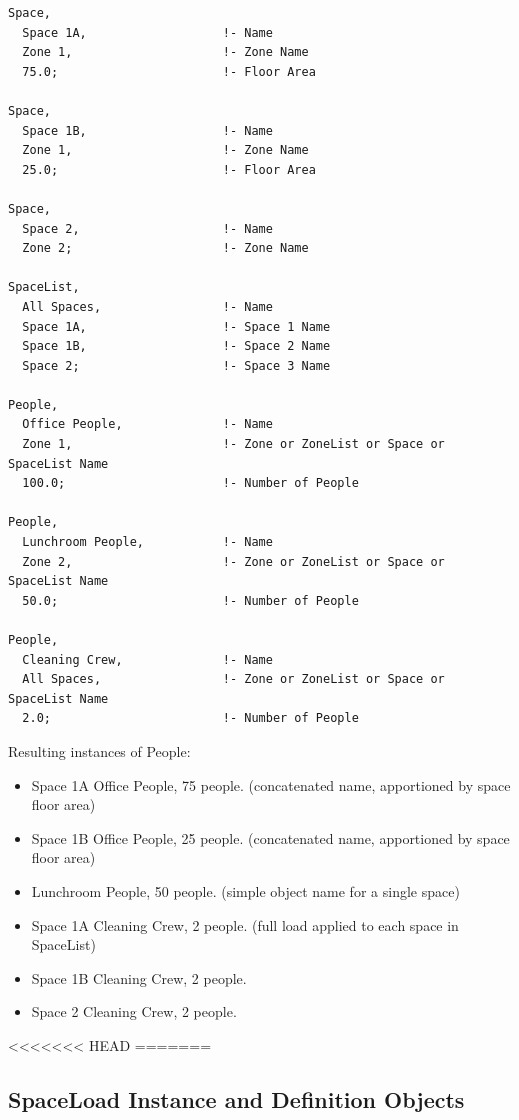 \begin{lstlisting}
Space,
  Space 1A,                   !- Name
  Zone 1,                     !- Zone Name
  75.0;                       !- Floor Area

Space,
  Space 1B,                   !- Name
  Zone 1,                     !- Zone Name
  25.0;                       !- Floor Area

Space,
  Space 2,                    !- Name
  Zone 2;                     !- Zone Name

SpaceList,
  All Spaces,                 !- Name
  Space 1A,                   !- Space 1 Name
  Space 1B,                   !- Space 2 Name
  Space 2;                    !- Space 3 Name

People,
  Office People,              !- Name
  Zone 1,                     !- Zone or ZoneList or Space or SpaceList Name
  100.0;                      !- Number of People

People,
  Lunchroom People,           !- Name
  Zone 2,                     !- Zone or ZoneList or Space or SpaceList Name
  50.0;                       !- Number of People

People,
  Cleaning Crew,              !- Name
  All Spaces,                 !- Zone or ZoneList or Space or SpaceList Name
  2.0;                        !- Number of People
\end{lstlisting}

Resulting instances of People:

\begin{itemize}
  \item  Space 1A Office People, 75 people. (concatenated name, apportioned by space floor area)
  \item  Space 1B Office People, 25 people. (concatenated name, apportioned by space floor area)
  \item  Lunchroom People, 50 people.       (simple object name for a single space)
  \item  Space 1A Cleaning Crew, 2 people.  (full load applied to each space in SpaceList)
  \item  Space 1B Cleaning Crew, 2 people.
  \item  Space 2 Cleaning Crew, 2 people.
\end{itemize}


<<<<<<< HEAD
=======

\subsection{SpaceLoad Instance and Definition Objects}\label{internal-gains-instance-and-definition-objects}

